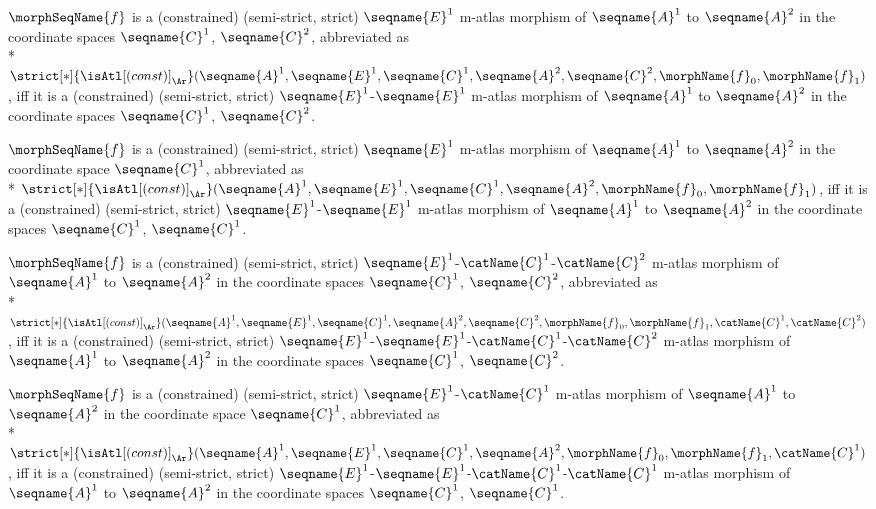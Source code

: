 \documentclass{article}
\begin{document}
\begin{definition}
$\morphSeqName{f}$ is a (constrained) (semi-strict, strict)
$\seqname{E}^1$ m-atlas morphism of $\seqname{A}^1$ to
$\seqname{A}^2$ in the coordinate spaces $\seqname{C}^1$,
$\seqname{C}^2$, abbreviated as \\*
$
  \strict[*]{\isAtl[(const)]_\Ar}
  (
    \seqname{A}^1,
    \seqname{E}^1,
    \seqname{C}^1,
    \seqname{A}^2,
    \seqname{C}^2,
    \morphName{f}_0,
    \morphName{f}_1
    )
$,
iff it is a (constrained) (semi-strict, strict)
$\seqname{E}^1$-$\seqname{E}^1$ m-atlas morphism of
$\seqname{A}^1$ to $\seqname{A}^2$ in the coordinate spaces
$\seqname{C}^1$, $\seqname{C}^2$.

$\morphSeqName{f}$ is a (constrained) (semi-strict, strict)
$\seqname{E}^1$ m-atlas morphism of $\seqname{A}^1$ to
$\seqname{A}^2$ in the coordinate space $\seqname{C}^1$, abbreviated as
\\*
$
  \strict[*]{\isAtl[(const)]_\Ar}
  (
    \seqname{A}^1,
    \seqname{E}^1,
    \seqname{C}^1,
    \seqname{A}^2,
    \morphName{f}_0,
    \morphName{f}_1
  )
$,
iff it is a (constrained) (semi-strict, strict) $\seqname{E}^1$-$\seqname{E}^1$
m-atlas morphism of
$\seqname{A}^1$ to $\seqname{A}^2$ in the coordinate spaces
$\seqname{C}^1$, $\seqname{C}^1$.

$\morphSeqName{f}$ is a (constrained) (semi-strict, strict)
$\seqname{E}^1$-$\catName{C}^1$-$\catName{C}^2$ m-atlas
morphism of $\seqname{A}^1$ to $\seqname{A}^2$ in the coordinate
spaces $\seqname{C}^1$, $\seqname{C}^2$, abbreviated as \\*
$
  \strict[*]{\isAtl[(const)]_\Ar}
    (
      \seqname{A}^1,
      \seqname{E}^1,
      \seqname{C}^1,
      \seqname{A}^2,
      \seqname{C}^2,
      \morphName{f}_0,
      \morphName{f}_1,
      \catName{C}^1,
      \catName{C}^2
    )
$,
iff it is a (constrained) (semi-strict, strict)
$\seqname{E}^1$-$\seqname{E}^1$-$\catName{C}^1$-$\catName{C}^2$ m-atlas
morphism of $\seqname{A}^1$ to $\seqname{A}^2$ in the coordinate
spaces $\seqname{C}^1$, $\seqname{C}^2$.

$\morphSeqName{f}$ is a (constrained) (semi-strict, strict)
$\seqname{E}^1$-$\catName{C}^1$ m-atlas morphism of
$\seqname{A}^1$ to $\seqname{A}^2$ in the coordinate space
$\seqname{C}^1$, abbreviated as \\*
$
  \strict[*]{\isAtl[(const)]_\Ar}
  (
    \seqname{A}^1,
    \seqname{E}^1,
    \seqname{C}^1,
    \seqname{A}^2,
    \morphName{f}_0,
    \morphName{f}_1,
    \catName{C}^1
  )
$,
iff it is a (constrained) (semi-strict, strict)
$\seqname{E}^1$-$\seqname{E}^1$-$\catName{C}^1$-$\catName{C}^1$ m-atlas
morphism of $\seqname{A}^1$ to $\seqname{A}^2$ in the coordinate
spaces $\seqname{C}^1$, $\seqname{C}^1$.


\end{definition}
\end{document}
